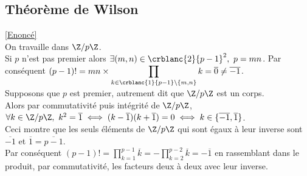 \documentclass[8pt]{book}
\begin{document}
	\subsection{Théorème de Wilson }
	\textcolor{blue}{\hyperref[Théorème de Wilson]{[Enoncé]}}\\
	\label{Théorème de Wilson corrigé}
	On travaille dans $\Z/p\Z$.\\
	Si $p$ n'est pas premier alors $\exists (m,n)\in \crblanc{2}{p-1}^2,\ p=mn$. Par conséquent $(p-1)!=mn\times\displaystyle\prod_{k\in \crblanc{1}{p-1}\backslash\{m,n\}}k=\overline 0\ne \overline{-1}$.\\
	Supposons que $p$ est premier, autrement dit que $\Z/p\Z$ est un corps.\\
	Alors par commutativité puis intégrité de $\Z/p\Z$, $\forall k\in \Z/p\Z,\ k^2=\overline 1\iff (k-\overline 1)(k+\overline 1)=0\iff k\in \{\overline{-1},\overline 1\}$.\\
	Ceci montre que les seuls éléments de $\Z/p\Z$ qui sont égaux à leur inverse sont $\overline{-1}$ et $\overline 1=\overline{p-1}$.\\
	Par conséquent $(p-1)!=\displaystyle\prod_{k=1}^{p-1}\overline k=-\prod_{k=2}^{p-2}\overline k=-\overline 1$ en rassemblant dans le produit, par commutativité, les facteurs deux à deux avec leur inverse.
	
\end{document}
